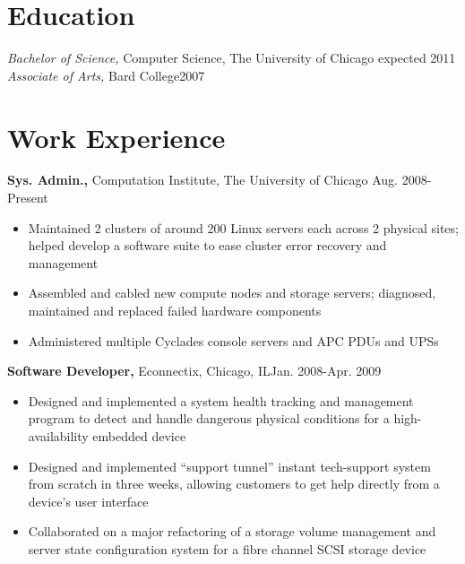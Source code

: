 \documentclass[line,overlapped]{res}
\begin{document}
 
 
 
\address{jalewis@uchicago.edu \hspace{1.6in} Current: 1151 E. 61th St. Apt. 1E, Chicago, IL 60637}
\address{(917) 974-7144 \hspace{2.18in} Permananent: 6 Warren Place, Brooklyn, NY 11201}

 
\newsectionwidth{.2in}
\begin{resume} 
 
\section{Education} 
{\sl Bachelor of Science,} Computer Science, The University of Chicago \hfill expected 2011\\
{\sl Associate of Arts,} Bard College\hfill 2007\\

\section{Work Experience}
{\bf Sys. Admin.,} Computation Institute, The University of Chicago \hfill Aug. 2008-Present
\begin{itemize} \itemsep -2pt %
    \item Maintained 2 clusters of around 200 Linux servers each across 2 physical sites; helped develop a software suite to ease cluster error recovery and management
    \item Assembled and cabled new compute nodes and storage servers; diagnosed, maintained and replaced failed hardware components
    \item Administered multiple Cyclades console servers and APC PDUs and UPSs
\end{itemize}

{\bf Software Developer,} Econnectix, Chicago, IL\hfill Jan. 2008-Apr. 2009
\begin{itemize} \itemsep -2pt %
    \item Designed and implemented a system health tracking and management program to detect and handle dangerous physical conditions for a high-availability embedded device
    \item Designed and implemented ``support tunnel'' instant tech-support system from scratch in three weeks, allowing customers to get help directly from a device's user interface
    \item Collaborated on a major refactoring of a storage volume management and server state configuration system for a fibre channel SCSI storage device
\end{itemize}


\end{resume}
\end{document}
